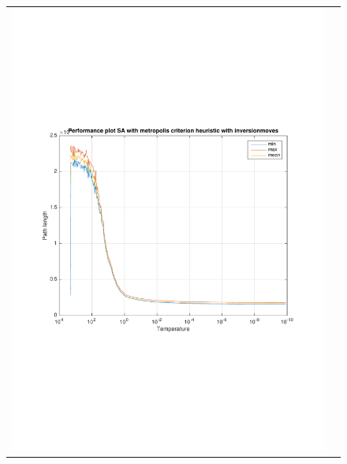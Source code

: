 \documentclass[a4paper, 11pt]{scrartcl}
\begin{document}
\begin{figure}[!ht]
\begin{tabular}{cc}
    \includegraphics[scale=0.4, trim={3cm 6cm 1cm 6cm}]{../figures/perfPlot_SA_metropolis_inversion.pdf} & 

\end{tabular}
\end{figure}
\end{document}
